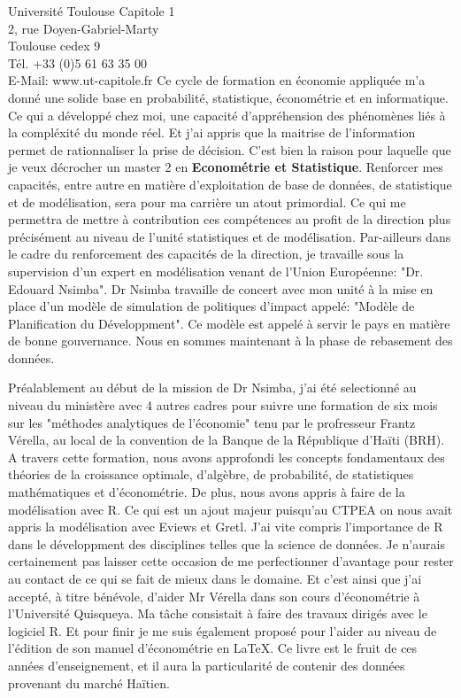 \documentclass[12pt]{lettre}
\begin{document}
\begin{letter}{
Universit\'{e} Toulouse Capitole 1\\
2, rue Doyen-Gabriel-Marty\\
Toulouse cedex 9\\
T\'{e}l. +33 (0)5 61 63 35 00\\
E-Mail: www.ut-capitole.fr}
Ce cycle de formation en \'{e}conomie appliqu\'{e}e m'a donn\'{e} une solide base en probabilit\'{e}, statistique, \'{e}conom\'{e}trie et en informatique. Ce qui a d\'{e}velopp\'{e} chez moi, une capacit\'{e} d'appr\'{e}hension des ph\'{e}nom\`{e}nes li\'{e}s \`{a} la compl\'{e}xit\'{e} du monde r\'{e}el. Et j'ai appris que la maitrise de l'information permet de rationnaliser la prise de d\'{e}cision. C'est bien la raison pour laquelle  que je veux d\'{e}crocher un master 2 en \textbf{Econom\'{e}trie et Statistique}. Renforcer mes capacit\'{e}s, entre autre en mati\`{e}re d'exploitation de base de donn\'{e}es, de statistique et de mod\'{e}lisation, sera pour ma carri\`{e}re un atout primordial. Ce qui me  permettra de mettre \`{a} contribution ces comp\'{e}tences au profit de la direction plus pr\'{e}cis\'{e}ment au niveau de l'unit\'{e} statistiques et de mod\'{e}lisation. Par-ailleurs dans le cadre du renforcement des capacit\'{e}s de la direction, je travaille sous la supervision d'un expert en mod\'{e}lisation venant de l'Union Europ\'{e}enne: "Dr. Edouard Nsimba". Dr Nsimba travaille de concert avec mon unit\'{e} \`{a} la mise en place d'un mod\`{e}le de simulation de politiques d'impact appel\'{e}: "Mod\`{e}le de Planification du D\'{e}veloppment". Ce mod\`{e}le est appel\'{e} \`{a} servir le pays en mati\`{e}re de bonne gouvernance. Nous  en sommes maintenant \`{a} la phase de rebasement des donn\'{e}es.

Pr\'{e}alablement au d\'{e}but de la mission de Dr Nsimba, j'ai \'{e}t\'{e} selectionn\'{e} au niveau du minist\`{e}re avec 4 autres cadres pour  suivre une formation de six mois sur les "m\'{e}thodes analytiques de l'\'{e}conomie"  tenu par le profresseur Frantz V\'{e}rella, au local de la convention de la Banque de la R\'{e}publique d'Ha\"{i}ti (BRH). A travers cette formation, nous avons approfondi les concepts fondamentaux des  th\'{e}ories de la croissance optimale, d'alg\`{e}bre, de probabilit\'{e}, de statistiques math\'{e}matiques et d'\'{e}conom\'{e}trie. De plus, nous avons appris \`{a} faire de la mod\'{e}lisation avec R. Ce qui est un ajout majeur puisqu'au CTPEA on nous avait appris la mod\'{e}lisation avec Eviews et Gretl. J'ai vite compris l'importance de R dans le d\'{e}veloppment des disciplines telles que la science de donn\'{e}es. Je n'aurais certainement pas laisser cette occasion de me perfectionner d'avantage pour rester au contact de ce qui se fait de mieux dans le domaine. Et c'est ainsi que j'ai accept\'{e}, \`{a} titre b\'{e}n\'{e}vole, d'aider Mr V\'{e}rella dans son cours d'\'{e}conom\'{e}trie \`{a} l'Universit\'{e} Quisqueya. Ma t\^{a}che consistait \`{a} faire des travaux dirig\'{e}s avec le logiciel R. Et pour finir je me suis \'{e}galement propos\'{e} pour l'aider au niveau de l'\'{e}dition de son manuel d'\'{e}conom\'{e}trie en \LaTeX. Ce livre est le fruit de ces ann\'{e}es d'enseignement, et il aura la particularit\'{e} de contenir des donn\'{e}es provenant du march\'{e} Ha\"{i}tien. 
 

\end{letter}
\end{document}

